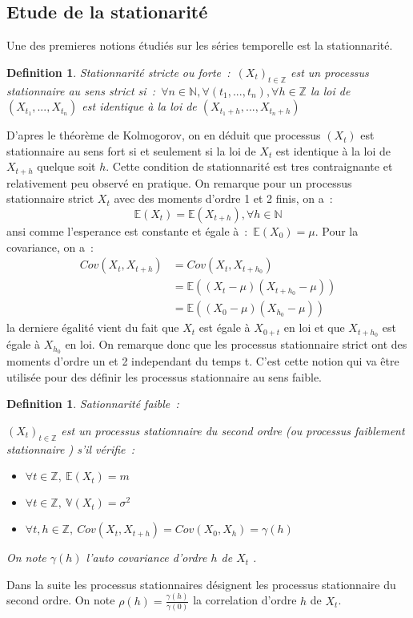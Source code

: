 \documentclass[11pt]{scrartcl} %
\newtheorem{Def}[theorem]{Definition}
\begin{document}
\subsection{Etude de la stationarité}
Une des premieres notions étudiés sur les séries temporelle est la stationnarité.
\begin{Def}
Stationnarité stricte ou forte~:~$\left(X_t\right)_{t\in\mathbb{Z}}$ est un processus stationnaire au sens strict si~:~$\forall n\in \mathbb{N}, \forall (t_1,...,t_n), \forall h\in\mathbb{Z}$ la loi de $(X_{t_1},...,X_{t_n})$ est identique à la loi de $(X_{t_1+h},...,X_{t_n+h})$
\end{Def}
D'apres le théorème de Kolmogorov, on en déduit que processus $\left(X_t\right)$ est stationnaire au sens fort si et seulement si la loi de $X_t$ est identique à la loi de $X_{t+h}$ quelque soit $h$. Cette condition de stationnarité est tres contraignante et relativement peu observé en pratique. On remarque pour un processus stationnaire strict $X_t$ avec des moments d'ordre 1 et 2 finis, on a~:
$$
\mathbb{E}\left(X_t\right)=\mathbb{E}\left(X_{t+h}\right), \forall h\in \mathbb{N}
$$
ansi comme l'esperance est constante et égale à~:~$\mathbb{E}\left(X_0\right)=\mu$. Pour la covariance, on a~:
\begin{align*}
Cov\left(X_t,X_{t+h}\right)& = Cov\left(X_t,X_{t+h_0}\right)\\
&= \mathbb{E}\left((X_t-\mu)(X_{t+h_0}-\mu)\right)\\
&= \mathbb{E}\left((X_0-\mu)(X_{h_0}-\mu)\right)
\end{align*}
la derniere égalité vient du fait que $X_t$ est égale à $X_{0+t}$ en loi et que $X_{t+h_0}$ est égale à $X_{h_0}$ en loi.
On remarque donc que les processus stationnaire strict ont des moments d'ordre un et 2 independant du temps t. C'est cette notion qui va être utilisée pour des définir les processus stationnaire au sens faible.
\begin{Def}
Sationnarité faible~:~

$\left(X_t\right)_{t\in\mathbb{Z}}$ est un processus stationnaire du second ordre (ou processus faiblement stationnaire ) s'il vérifie~:
\begin{itemize}
\item[i)]$\forall t\in\mathbb{Z},~\mathbb{E}\left(X_t\right)=m $ 
\item[ii)]$\forall t\in\mathbb{Z},~\mathbb{V}\left(X_t\right)=\sigma^2 $ 
\item[iii)]$\forall t,h\in\mathbb{Z},~Cov\left(X_t,X_{t+h}\right)=Cov\left(X_0,X_h\right)=\gamma\left(h\right) $ 
\end{itemize}
On note $\gamma(h)$ l'auto covariance d'ordre $h$ de $X_t$ .
\end{Def} 
Dans la suite les processus stationnaires désignent les processus stationnaire du second ordre. On note $\rho(h)=\frac{\gamma(h)}{\gamma(0)}$ la correlation d'ordre $h$ de $X_t$.
\end{document}
